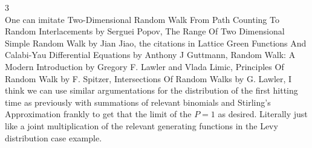 3 \\
One can imitate Two-Dimensional Random Walk From Path Counting To Random Interlacements by Serguei Popov, The Range Of Two Dimensional Simple Random Walk by Jian Jiao, the citations in Lattice Green Functions And Calabi-Yau Differential Equations by Anthony J Guttmann, Random Walk: A Modern Introduction by Gregory F. Lawler and Vlada Limic, Principles Of Random Walk by F. Spitzer, Intersections Of Random Walks by G. Lawler, I think we can use similar argumentations for the distribution of the first hitting time as previously with summations of relevant binomials and Stirling's Approximation frankly to get that the limit of the $P = 1$ as desired. Literally just like a joint multiplication of the relevant generating functions in the Levy distribution case example.


